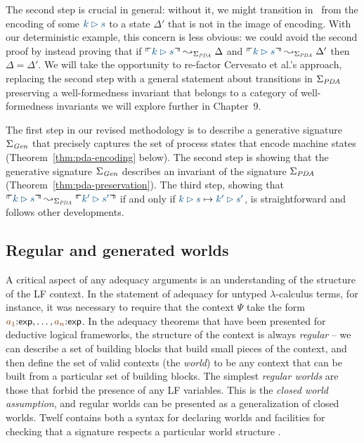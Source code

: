 The second step is crucial in general: without it, we might transition
in \sls~from the encoding of some $\obj{k \rhd s}$ to a state
$\Delta'$ that is not in the image of encoding.  With our
deterministic example, this concern is less obvious: we could avoid
the second proof by instead proving that if $\ctxinterp{k \rhd s}
\leadsto_{\Sigma_{\it PDA}} \Delta$ and $\ctxinterp{k \rhd s}
\leadsto_{\Sigma_{\it PDA}} \Delta'$ then $\Delta = \Delta'$. We will 
take the opportunity to re-factor Cervesato et al.'s approach, 
replacing the second step with a general statement about transitions
in $\Sigma_{\it PDA}$ preserving a well-formedness invariant that
belongs to a category of well-formedness invariants we will explore
further in Chapter~9. 

The first step in our revised methodology is to describe a generative
signature $\Sigma_{\it Gen}$ that precisely captures the set of
process states that encode machine states
(Theorem~\ref{thm:pda-encoding} below).  The second step is showing
that the generative signature $\Sigma_{\it Gen}$ describes an
invariant of the signature $\Sigma_{\it PDA}$
(Theorem~\ref{thm:pda-preservation}).  The third step, showing that
$\ctxinterp{k \rhd s} \leadsto_{\Sigma_{\it PDA}} \ctxinterp{k' \rhd
  s'}$ if and only if $\obj{k \rhd s} \mapsto \obj{k' \rhd s'}$, is
straightforward and follows other developments.

\subsection{Regular and generated worlds}

A critical aspect of any adequacy arguments is an understanding of the
structure of the LF context. In the statement of adequacy for untyped
$\lambda$-calculus terms, for instance, it was necessary to require
that the context $\Psi$ take the form $\lf{a_1}{:}{\sf
  exp},\ldots,\lf{a_n}{:}{\sf exp}$. In the adequacy theorems that
have been presented for deductive logical frameworks, the structure of
the context is always {\it regular} -- we can describe a set of
building blocks that build small pieces of the context, and then
define the set of valid contexts (the {\it world}) to be any context
that can be built from a particular set of building blocks.  The
simplest {\it regular worlds} are those that forbid the presence of
any LF variables. This is the {\it closed world assumption}, and
regular worlds can be presented as a generalization of closed worlds.
Twelf contains both
a syntax for declaring worlds and facilities for checking that a
signature respects a particular world structure
\cite{schurmann00automating}.

